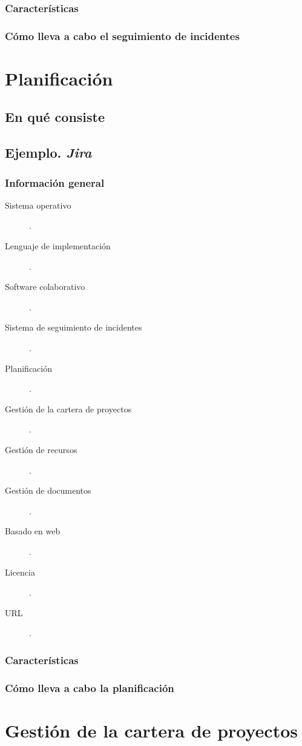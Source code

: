 \documentclass[11pt,a4paper,spanish,twoside]{report}
\begin{document}
	\subsection{Características}
	\subsection{Cómo lleva a cabo el seguimiento de incidentes}

\chapter{Planificación}
\section{En qué consiste}
\section{Ejemplo. \emph{Jira}}
  \subsection{Información general}
    \begin{description}
		\item[Sistema operativo]. 
		\item[Lenguaje de implementación].
    \item[Software colaborativo]. 
    \item[Sistema de seguimiento de incidentes]. 
		\item[Planificación].
		\item[Gestión de la cartera de proyectos].
		\item[Gestión de recursos].
		\item[Gestión de documentos].
		\item[Basado en web].
		\item[Licencia].
		\item[URL].
		\end{description}
	\subsection{Características}
	\subsection{Cómo lleva a cabo la planificación}

\chapter{Gestión de la cartera de proyectos}
\end{document}
